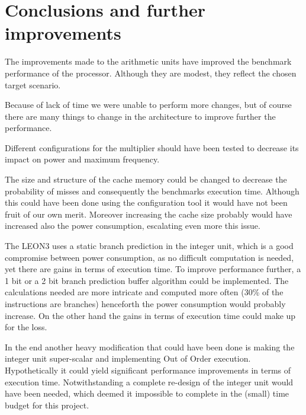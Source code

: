 \section{Conclusions and further improvements}

The improvements made to the arithmetic units have improved the benchmark performance of the processor. Although they are modest, they reflect the chosen target scenario.

Because of lack of time we were unable to perform more changes, but of course there are many things to
change in the architecture to improve further the performance.

Different configurations for the multiplier should have been tested to decrease its impact on power and maximum frequency.

The size and structure of the cache memory could be changed to decrease the probability of misses and consequently the benchmarks execution time. Although this could have been done using the configuration tool it
would have not been fruit of our own merit. Moreover increasing the cache size probably would
have increased also the power consumption, escalating even more this issue.

The LEON3 uses a static branch prediction in the integer unit, which is a good compromise
between power consumption, as no difficult computation is needed, yet there are gains in terms of execution time.
To improve performance further, a 1 bit or a 2 bit branch prediction buffer
algorithm could be implemented. The calculations needed are more intricate and computed more often (30\% of
the instructions are branches) henceforth the power consumption would probably increase. On the other hand the gains in terms of execution time could make up for the loss.

In the end another heavy modification that could have been done is making the
integer unit super-scalar and implementing Out of Order execution. Hypothetically it could yield 
significant performance improvements in terms of execution time. Notwithstanding a complete re-design of the integer unit
would have been needed, which deemed it impossible to complete in the (small) time budget for this project.